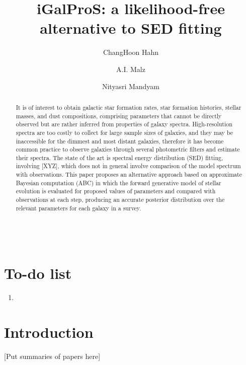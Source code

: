 \documentclass[12pt, onecolumn]{emulateapj}
\begin{document}
\begin{align}
\end{align}

\title{iGalProS: a likelihood-free alternative to SED fitting}

\author{ChangHoon Hahn}
\author{A.I. Malz}
\author{Nityasri Mandyam}

\begin{abstract}
It is of interest to obtain galactic star formation rates, star formation histories, stellar masses, and dust compositions, comprising parameters that cannot be directly observed but are rather inferred from properties of galaxy spectra.  High-resolution spectra are too costly to collect for large sample sizes of galaxies, and they may be inaccessible for the dimmest and most distant galaxies, therefore it has become common practice to observe galaxies through several photometric filters and estimate their spectra.  The state of the art is spectral energy distribution (SED) fitting, involving [XYZ], which does not in general involve comparison of the model spectrum with observations.  This paper proposes an alternative approach based on approximate Bayesian computation (ABC) in which the forward generative model of stellar evolution is evaluated for proposed values of parameters and compared with observations at each step, producing an accurate posterior distribution over the relevant parameters for each galaxy in a survey.
\end{abstract}


\section*{To-do list}
\begin{enumerate}
\item
\end{enumerate}

\section{Introduction}

[Put summaries of papers here]

\acknowledgments{}

\appendix{}


\end{document}
